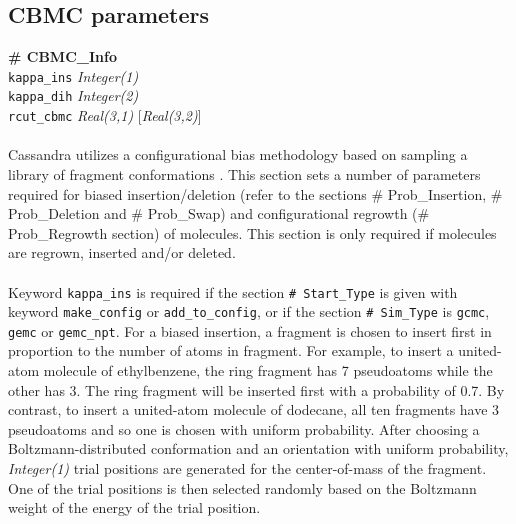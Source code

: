 \subsection{CBMC parameters}\label{sec:CBMC_Info}
{\bf \# CBMC\_Info} \\
{\tt kappa\_ins} {\it Integer(1)} \\
{\tt kappa\_dih} {\it Integer(2)} \\
{\tt rcut\_cbmc} {\it Real(3,1)} [{\it Real(3,2)}] \\ \\
%
Cassandra utilizes a configurational bias methodology based on sampling a library of fragment conformations \cite{Shah:2011}.
This section sets a number of parameters required for biased insertion/deletion (refer to the sections
\# Prob\_Insertion, \# Prob\_Deletion and \# Prob\_Swap) and configurational
regrowth (\# Prob\_Regrowth section) of molecules.
This section is only required if molecules are regrown, inserted and/or deleted. \\ \\
%
Keyword {\tt kappa\_ins} is required
if the section {\tt \# Start\_Type} is given with keyword {\tt make\_config} or {\tt add\_to\_config}, or
if the section {\tt \# Sim\_Type} is {\tt gcmc}, {\tt gemc} or {\tt gemc\_npt}.
For a biased insertion, a fragment is chosen to insert first in proportion to the number of atoms in fragment.
For example, to insert a united-atom molecule of ethylbenzene,
the ring fragment has 7 pseudoatoms while the other has 3.
The ring fragment will be inserted first with a probability of 0.7.
By contrast, to insert a united-atom molecule of dodecane,
all ten fragments have 3 pseudoatoms and so one is chosen with uniform probability.
After choosing a Boltzmann-distributed conformation and an orientation with uniform probability,
{\it Integer(1)} trial positions are generated for the center-of-mass of the fragment.
One of the trial positions is then selected randomly based on the Boltzmann weight of the energy of the trial position. \\ \\
%
